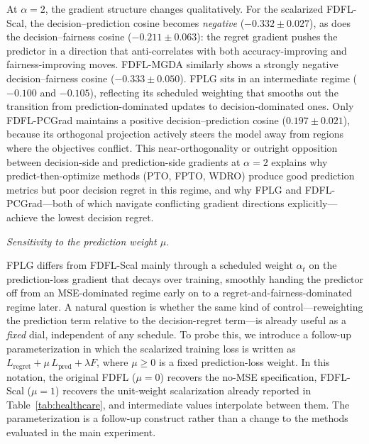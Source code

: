 \documentclass[ijoc,sglanonrev]{informs4}
\begin{document}
At $\alpha = 2$, the gradient structure changes qualitatively. For the scalarized FDFL-Scal, the decision--prediction cosine becomes \emph{negative} ($-0.332 \pm 0.027$), as does the decision--fairness cosine ($-0.211 \pm 0.063$): the regret gradient pushes the predictor in a direction that anti-correlates with both accuracy-improving and fairness-improving moves. FDFL-MGDA similarly shows a strongly negative decision--fairness cosine ($-0.333 \pm 0.050$). FPLG sits in an intermediate regime ($-0.100$ and $-0.105$), reflecting its scheduled weighting that smooths out the transition from prediction-dominated updates to decision-dominated ones. Only FDFL-PCGrad maintains a positive decision--prediction cosine ($0.197 \pm 0.021$), because its orthogonal projection actively steers the model away from regions where the objectives conflict. This near-orthogonality or outright opposition between decision-side and prediction-side gradients at $\alpha = 2$ explains why predict-then-optimize methods (PTO, FPTO, WDRO) produce good prediction metrics but poor decision regret in this regime, and why FPLG and FDFL-PCGrad---both of which navigate conflicting gradient directions explicitly---achieve the lowest decision regret.

\textit{Sensitivity to the prediction weight $\mu$.}

FPLG differs from FDFL-Scal mainly through a scheduled weight
$\alpha_t$ on the prediction-loss gradient that decays over
training, smoothly handing the predictor off from an MSE-dominated
regime early on to a regret-and-fairness-dominated regime later.
A natural question is whether the same kind of control---reweighting
the prediction term relative to the decision-regret term---is
already useful as a \emph{fixed} dial, independent of any schedule.
To probe this, we introduce a follow-up parameterization in which
the scalarized training loss is written as
$L_{\mathrm{regret}} + \mu\,L_{\mathrm{pred}} + \lambda F$, where
$\mu \ge 0$ is a fixed prediction-loss weight. In this notation,
the original FDFL ($\mu = 0$) recovers the no-MSE specification,
FDFL-Scal ($\mu = 1$) recovers the unit-weight scalarization
already reported in Table~\ref{tab:healthcare}, and intermediate
values interpolate between them. The parameterization is a
follow-up construct rather than a change to the methods evaluated
in the main experiment.
\end{document}
